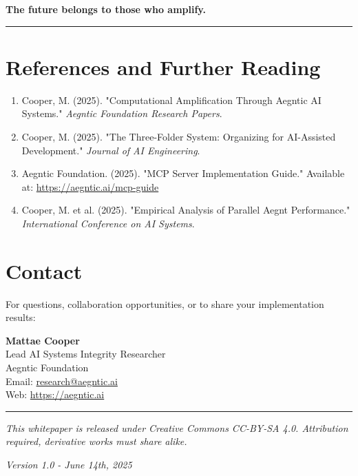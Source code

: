 \documentclass[11pt]{article}
\begin{document}
\textbf{The future belongs to those who amplify.}

\vspace{2em}
\hrule
\vspace{1em}

\section*{References and Further Reading}

\begin{enumerate}
\item Cooper, M. (2025). "Computational Amplification Through Aegntic AI Systems." \textit{Aegntic Foundation Research Papers}.
\item Cooper, M. (2025). "The Three-Folder System: Organizing for AI-Assisted Development." \textit{Journal of AI Engineering}.
\item Aegntic Foundation. (2025). "MCP Server Implementation Guide." Available at: \url{https://aegntic.ai/mcp-guide}
\item Cooper, M. et al. (2025). "Empirical Analysis of Parallel Aegnt Performance." \textit{International Conference on AI Systems}.
\end{enumerate}

\section*{Contact}

For questions, collaboration opportunities, or to share your implementation results:

\textbf{Mattae Cooper}\\
Lead AI Systems Integrity Researcher\\
Aegntic Foundation\\
Email: \href{mailto:research@aegntic.ai}{research@aegntic.ai}\\
Web: \url{https://aegntic.ai}

\vspace{2em}
\hrule
\vspace{1em}

\textit{This whitepaper is released under Creative Commons CC-BY-SA 4.0. Attribution required, derivative works must share alike.}

\textit{Version 1.0 - June 14th, 2025}
\end{document}
